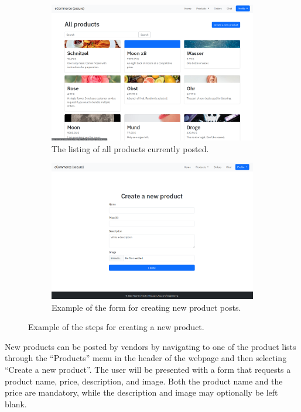 \documentclass[conference,onecolumn,a4paper]{IEEEtran}
\begin{document}
\begin{figure}[H]
    \centering
    \begin{subfigure}[b]{0.4\linewidth}
        \includegraphics[width=\linewidth]{resources/products.png}
        \caption{The listing of all products currently posted.}
    \end{subfigure}
    \begin{subfigure}[b]{0.4\linewidth}
        \includegraphics[width=\linewidth]{resources/new-product.png}
        \caption{Example of the form for creating new product posts.}
    \end{subfigure}
    \caption{Example of the steps for creating a new product.}
\end{figure}

New products can be posted by vendors by navigating to one of the product lists through the “Products” menu in the header of the webpage and then selecting “Create a new product”. The user will be presented with a form that requests a product name, price, description, and image. Both the product name and the price are mandatory, while the description and image may optionally be left blank.
\end{document}
